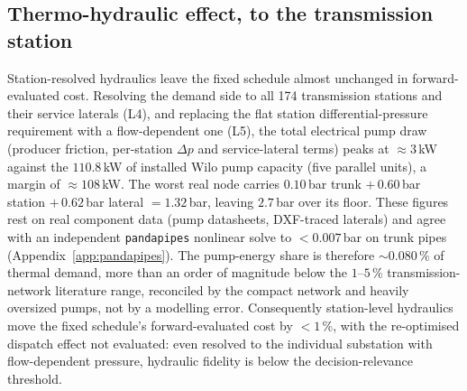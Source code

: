 \documentclass[a4paper,fleqn]{cas-sc}
\begin{document}
\subsection{Thermo-hydraulic effect, to the transmission station}\label{subsec:hydraulics}
Station-resolved hydraulics leave the fixed schedule almost unchanged in forward-evaluated cost. Resolving the demand side
to all 174 transmission stations and their service laterals (L4), and replacing the
flat station differential-pressure requirement with a flow-dependent one (L5), the
total electrical pump draw (producer friction, per-station $\Delta p$ and
service-lateral terms) peaks at $\approx 3$\,kW against the $110.8$\,kW of installed
Wilo pump capacity (five parallel units), a margin of $\approx 108$\,kW. The worst
real node carries $0.10$\,bar trunk $+\,0.60$\,bar station $+\,0.62$\,bar lateral
$=1.32$\,bar, leaving $2.7$\,bar over its floor. These figures rest on real component
data (pump datasheets, DXF-traced laterals) and agree with an independent
\texttt{pandapipes} nonlinear solve to $<0.007$\,bar on trunk pipes
(Appendix~\ref{app:pandapipes}). The pump-energy share is therefore $\sim\!0.080$\,\%
of thermal demand, more than an order of magnitude below the $1$--$5$\,\% transmission-network literature
range, reconciled by the compact network and heavily oversized pumps, not by a
modelling error. Consequently station-level hydraulics move the fixed schedule's forward-evaluated cost by
$<1$\,\%, with the re-optimised dispatch effect not evaluated: even resolved to the individual substation with
flow-dependent pressure, hydraulic fidelity is below the decision-relevance threshold.
\end{document}
